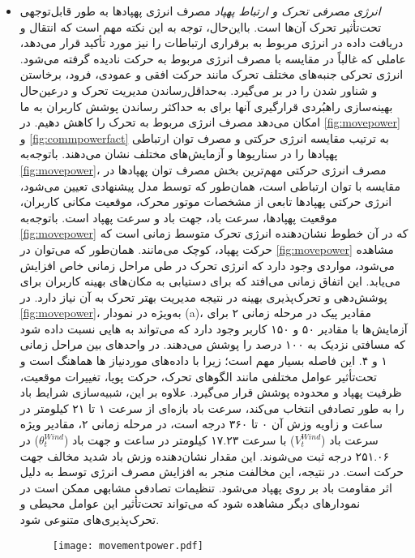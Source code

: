 \begin{itemize}
	\item  \textit{انرژی مصرفی تحرک و ارتباط پهپاد}
	مصرف انرژی پهپادها به طور قابل‌توجهی تحت‌تأثیر تحرک آن‌ها است. بااین‌حال، توجه به این نکته مهم است که انتقال و دریافت داده در  انرژی مربوط به برقراری ارتباطات را نیز مورد تأکید قرار می‌دهد، عاملی که غالباً در مقایسه با مصرف انرژی مربوط به حرکت نادیده گرفته می‌شود. انرژی تحرکی جنبه‌های مختلف تحرک مانند حرکت افقی و عمودی، فرود، برخاستن و شناور شدن را در بر می‌گیرد. به‌حداقل‌رساندن مدیریت تحرک  و درعین‌حال بهینه‌سازی راهبُردی قرارگیری آنها برای به حداکثر رساندن پوشش کاربران به ما امکان می‌دهد مصرف انرژی مربوط به تحرک را کاهش دهیم.
	در \autoref{fig:movepower} و \autoref{fig:commpowerfact} به ترتیب مقایسه انرژی حرکتی و مصرف توان ارتباطی پهپادها را در سناریوها و آزمایش‌های مختلف نشان می‌دهند.
	باتوجه‌به \autoref{fig:movepower}، مصرف انرژی حرکتی مهم‌ترین بخش مصرف توان پهپادها در مقایسه با توان ارتباطی است، همان‌طور که توسط مدل پیشنهادی تعیین می‌شود، انرژی حرکتی پهپادها تابعی از مشخصات موتور محرک، موقعیت مکانی کاربران، موقعیت پهپادها، سرعت باد، جهت باد و سرعت پهپاد است. باتوجه‌به \autoref{fig:movepower} که در آن خطوط نشان‌دهنده انرژی تحرک متوسط زمانی است که حرکت پهپاد، کوچک می‌مانند.
	همان‌طور که می‌توان در \autoref{fig:movepower} مشاهده می‌شود، مواردی وجود دارد که انرژی تحرک در طی مراحل زمانی خاص افزایش می‌یابد. این اتفاق زمانی می‌افتد که  برای دستیابی به مکان‌های بهینه کاربران برای پوشش‌دهی و تحرک‌پذیری بهینه در نتیجه مدیریت بهتر تحرک به آن نیاز دارد.
	در \autoref{fig:movepower}، به‌ویژه در نمودار (a)، مقادیر پیک در مرحله زمانی ۲ برای آزمایش‌ها با مقادیر ۵۰ و ۱۵۰ کاربر وجود دارد که می‌تواند به هایی نسبت داده شود که مسافتی نزدیک به ۱۰۰ درصد را پوشش می‌دهند. در واحدهای بین مراحل زمانی ۱ و ۴. این فاصله بسیار مهم است؛ زیرا با داده‌های موردنیاز ها هماهنگ است و تحت‌تأثیر عوامل مختلفی مانند الگوهای تحرک، حرکت پویا، تغییرات موقعیت، ظرفیت پهپاد و محدوده پوشش قرار می‌گیرد. علاوه بر این، شبیه‌سازی شرایط باد را به طور تصادفی انتخاب می‌کند، سرعت باد بازه‌ای از سرعت ۱ تا ۲۱ کیلومتر در ساعت و زاویه وزش آن ۰ تا ۳۶۰ درجه است، در مرحله زمانی ۲، مقادیر ویژه سرعت باد ($V_{t}^{Wind}$) با سرعت ۱۷.۲۳ کیلومتر در ساعت و جهت باد ($\theta_{t}^{Wind}$) در ۲۵۱.۰۶ درجه ثبت می‌شوند. این مقدار نشان‌دهنده وزش باد شدید مخالف جهت حرکت  است. در نتیجه، این مخالفت منجر به افزایش مصرف انرژی توسط  به دلیل اثر مقاومت باد بر روی پهپاد می‌شود. تنظیمات تصادفی مشابهی ممکن است در نمودارهای دیگر مشاهده شود که می‌تواند تحت‌تأثیر این عوامل محیطی و تحرک‌پذیری‌های متنوعی شود.
\begin{figure}
\texttt{[image: movementpower.pdf]}

\end{figure}
\end{itemize}
